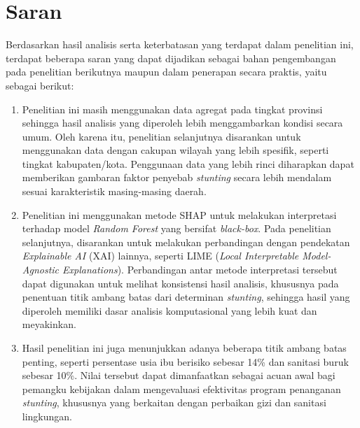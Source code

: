 \section{Saran} \label{V.Saran}
Berdasarkan hasil analisis serta keterbatasan yang terdapat dalam penelitian ini, terdapat beberapa saran yang dapat dijadikan sebagai bahan pengembangan pada penelitian berikutnya maupun dalam penerapan secara praktis, yaitu sebagai berikut:

\begin{enumerate}
    \item Penelitian ini masih menggunakan data agregat pada tingkat provinsi sehingga hasil analisis yang diperoleh lebih menggambarkan kondisi secara umum. Oleh karena itu, penelitian selanjutnya disarankan untuk menggunakan data dengan cakupan wilayah yang lebih spesifik, seperti tingkat kabupaten/kota. Penggunaan data yang lebih rinci diharapkan dapat memberikan gambaran faktor penyebab \textit{stunting} secara lebih mendalam sesuai karakteristik masing-masing daerah.
    
    \item Penelitian ini menggunakan metode SHAP untuk melakukan interpretasi terhadap model \textit{Random Forest} yang bersifat \textit{black-box}. Pada penelitian selanjutnya, disarankan untuk melakukan perbandingan dengan pendekatan \textit{Explainable AI} (XAI) lainnya, seperti LIME (\textit{Local Interpretable Model-Agnostic Explanations}). Perbandingan antar metode interpretasi tersebut dapat digunakan untuk melihat konsistensi hasil analisis, khususnya pada penentuan titik ambang batas dari determinan \textit{stunting}, sehingga hasil yang diperoleh memiliki dasar analisis komputasional yang lebih kuat dan meyakinkan.
    
    \item Hasil penelitian ini juga menunjukkan adanya beberapa titik ambang batas penting, seperti persentase usia ibu berisiko sebesar 14\% dan sanitasi buruk sebesar 10\%. Nilai tersebut dapat dimanfaatkan sebagai acuan awal bagi pemangku kebijakan dalam mengevaluasi efektivitas program penanganan \textit{stunting}, khususnya yang berkaitan dengan perbaikan gizi dan sanitasi lingkungan.
\end{enumerate}